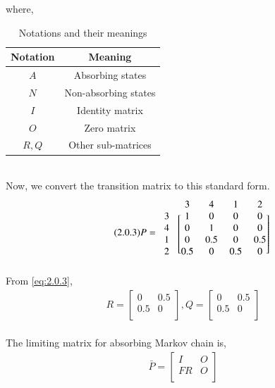 \documentclass[journal,12pt,twocolumn]{IEEEtran}
\begin{document}
where,
\begin{table}[h!]
\centering
\caption{Notations and their meanings}
\label{table:2}
\begin{tabular}{|c|c|}
    \hline
    Notation & Meaning \\
    \hline
    $A$ & Absorbing states\\[1ex]
    \hline
    $N$ & Non-absorbing states\\[1ex]
    \hline
    $I$ & Identity matrix\\[1ex]
    \hline
    $O$ & Zero matrix\\[1ex]
    \hline
    $R,Q$ & Other sub-matrices\\[1ex]
    \hline
\end{tabular}
\end{table}
\\Now, we convert the transition matrix to this standard form.
\begin{align}
\tag{2.0.3}
\label{eq:2.0.3}
    P = \begin{blockarray}{ccccc}
    &3 &4 &1 &2\\
    \begin{block}{c[cccc]}
    3 & 1 & 0 & 0 & 0 \\
    4 & 0 & 1 & 0 & 0 \\
    1 & 0 & 0.5 & 0 & 0.5 \\
    2 & 0.5 & 0 & 0.5 & 0 \\
    \end{block}
    \end{blockarray}
\end{align}
From \eqref{eq:2.0.3}, 
\begin{align}
    \tag{2.0.4}
    \label{eq:2.0.4}
    R = \begin{bmatrix}
    0 & 0.5\\
    0.5 & 0\\
    \end{bmatrix}
    , Q = \begin{bmatrix}
    0 & 0.5\\
    0.5 & 0\\
    \end{bmatrix}
\end{align}
\\The limiting matrix for absorbing Markov chain is,
\begin{align}
\tag{2.0.5}
\label{eq:2.0.5}
    \bar P=\begin{bmatrix}
    I & O\\
    FR & O\\
    \end{bmatrix}
\end{align}
\end{document}
